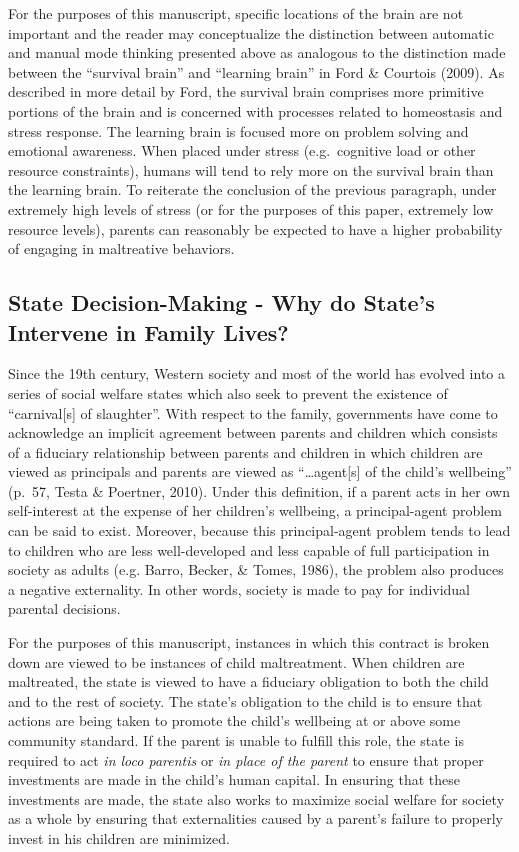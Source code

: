 \documentclass[review]{elsarticle}\usepackage[]{graphicx}\usepackage[]{color}
\begin{document}
For the purposes of this manuscript, specific locations of the brain are
not important and the reader may conceptualize the distinction between
automatic and manual mode thinking presented above as analogous to the
distinction made between the ``survival brain'' and ``learning brain''
in Ford \& Courtois (2009). As described in more detail by Ford, the
survival brain comprises more primitive portions of the brain and is
concerned with processes related to homeostasis and stress response. The
learning brain is focused more on problem solving and emotional
awareness. When placed under stress (e.g.~cognitive load or other
resource constraints), humans will tend to rely more on the survival
brain than the learning brain. To reiterate the conclusion of the
previous paragraph, under extremely high levels of stress (or for the
purposes of this paper, extremely low resource levels), parents can
reasonably be expected to have a higher probability of engaging in
maltreative behaviors.

\subsection{State Decision-Making - Why do State's Intervene in Family
Lives?}\label{state-decision-making---why-do-states-intervene-in-family-lives}

Since the 19th century, Western society and most of the world has
evolved into a series of social welfare states which also seek to
prevent the existence of ``carnival{[}s{]} of slaughter''. With respect
to the family, governments have come to acknowledge an implicit
agreement between parents and children which consists of a fiduciary
relationship between parents and children in which children are viewed
as principals and parents are viewed as ``\ldots{}agent{[}s{]} of the
child's wellbeing'' (p.~57, Testa \& Poertner, 2010). Under this
definition, if a parent acts in her own self-interest at the expense of
her children's wellbeing, a principal-agent problem can be said to
exist. Moreover, because this principal-agent problem tends to lead to
children who are less well-developed and less capable of full
participation in society as adults (e.g. Barro, Becker, \& Tomes, 1986),
the problem also produces a negative externality. In other words,
society is made to pay for individual parental decisions.

For the purposes of this manuscript, instances in which this contract is
broken down are viewed to be instances of child maltreatment. When
children are maltreated, the state is viewed to have a fiduciary
obligation to both the child and to the rest of society. The state's
obligation to the child is to ensure that actions are being taken to
promote the child's wellbeing at or above some community standard. If
the parent is unable to fulfill this role, the state is required to act
\emph{in loco parentis} or \emph{in place of the parent} to ensure that
proper investments are made in the child's human capital. In ensuring
that these investments are made, the state also works to maximize social
welfare for society as a whole by ensuring that externalities caused by
a parent's failure to properly invest in his children are minimized.
\end{document}
